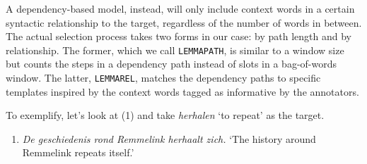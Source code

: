 \documentclass[
]{book}
\providecommand{\tightlist}{%
  \setlength{\itemsep}{0pt}\setlength{\parskip}{0pt}}
\begin{document}
A dependency-based model, instead, will only include context words in a certain
syntactic relationship to the target, regardless of the number of words in between.
The actual selection process takes two forms in our case: by path length and by
relationship. The former, which we call \texttt{LEMMAPATH}, is similar to a window size
but counts the steps in a dependency path instead of slots in a bag-of-words window.
The latter, \texttt{LEMMAREL}, matches the dependency paths to specific templates inspired
by the context words tagged as informative by the annotators.

To exemplify, let's look at (1) and take \emph{herhalen} `to repeat' as the target.

\begin{enumerate}
\def\labelenumi{(\arabic{enumi})}
\tightlist
\item
  \emph{De geschiedenis rond Remmelink herhaalt zich.} `The history around Remmelink repeats itself.'
\end{enumerate}
\end{document}
